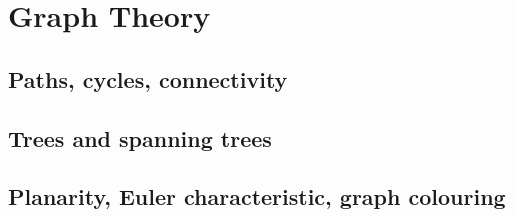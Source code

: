 
\section{Graph Theory}

\subsection{Paths, cycles, connectivity}


\subsection{Trees and spanning trees}


\subsection{Planarity, Euler characteristic, graph colouring}

